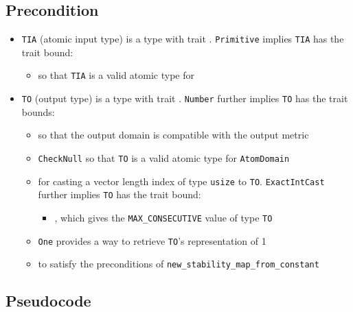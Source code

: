 \documentclass{article}
\begin{document}
\subsection*{Precondition}
\begin{itemize}

    \item \texttt{TIA} (atomic input type) is a type with trait . \texttt{Primitive} implies \texttt{TIA} has the trait bound:
    \begin{itemize}
        \item {} so that \texttt{TIA} is a valid atomic type for 
    \end{itemize}

    \item \texttt{TO} (output type) is a type with trait . \texttt{Number} further implies \texttt{TO} has the trait bounds:
    \begin{itemize}
        \item {} so that the output domain is compatible with the output metric
        \item \texttt{CheckNull} so that \texttt{TO} is a valid atomic type for \texttt{AtomDomain}
        \item {} for casting a vector length index of type \texttt{usize} to \texttt{TO}. \texttt{ExactIntCast} further implies \texttt{TO} has the trait bound:
        \begin{itemize}
            \item {}, which gives the \texttt{MAX\_CONSECUTIVE} value of type \texttt{TO}
        \end{itemize}

        \item \texttt{One} provides a way to retrieve \texttt{TO}'s representation of 1
        \item {} to satisfy the preconditions of \texttt{new\_stability\_map\_from\_constant}
    \end{itemize}
\end{itemize}

\subsection*{Pseudocode}

\end{document}
